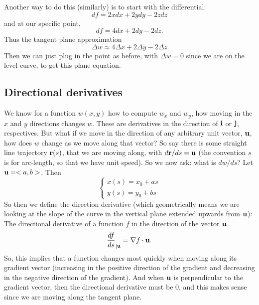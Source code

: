 Another way to do this (similarly) is to start with the differential:
\[ df = 2x dx + 2ydy -2z dz \]
and at our specific point,
\[ df = 4 dx + 2dy - 2dz .\]
Thus the tangent plane approximation
\[ \Delta w \approx 4 \Delta x + 2\Delta y -2\Delta z \]
Then we can just plug in the point as before, with $\Delta w = 0$ since we are on the level curve, to get this plane equation.
\eex

\subsection{Directional derivatives}
We know for a function $w(x,y)$ how to compute $w_x$ and $w_y$, how moving in the $x$ and $y$ directions changes $w$. These are derivatives in the direction of $\boldsymbol{\mathbf{i}}$ or $\boldsymbol{\mathbf{j}}$, respectives. But what if we move in the direction of any arbitrary unit vector, $\boldsymbol{\mathbf{u}}$, how does $w$ change as we move along that vector? So say there is some straight line trajectory $\boldsymbol{\mathbf{r}}(s)$, that we are moving along, with $d\boldsymbol{\mathbf{r}}/ds = \boldsymbol{\mathbf{u}}$ (the convention $s$ is for arc-length, so that we have unit speed). So we now ask: what is $dw/ds$? Let $\boldsymbol{\mathbf{u}} = <a, b>$. Then
\[ \begin{cases} x(s) = x_0 +  as \\
y(s) = y_0 + bs \end{cases} \]
So then we define the direction derivative (which geometrically means we are looking at the slope of the curve in the vertical plane extended upwards from $\boldsymbol{\mathbf{u}}$):
\bdf
The directional derivative of a function $f$ in the direction of the vector $\boldsymbol{\mathbf{u}}$
\[ \frac{df}{ds}_{|\boldsymbol{\mathbf{u}}} = \nabla f \cdot \boldsymbol{\mathbf{u}}. \]
\edf
So, this implies that a function changes most quickly when moving along its gradient vector (increasing in the positive direction of the gradient and decreasing in the negative direction of the gradient). And when $\boldsymbol{\mathbf{u}}$ is perpendicular to the gradient vector, then the directional derivative must be 0, and this makes sense since we are moving along the tangent plane. 





